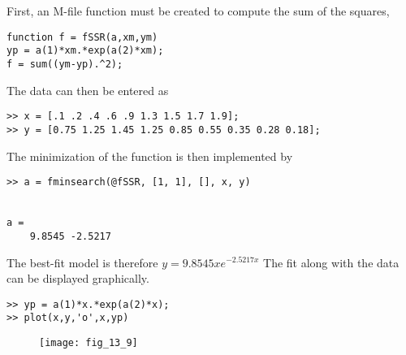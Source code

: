 \documentclass[../main.tex]{subfiles}
\begin{document}
\section{}
First, an M-file function must be created to compute the sum of the squares,
	\bigbreak
\begin{lstlisting}[numbers=none]
function f = fSSR(a,xm,ym)
yp = a(1)*xm.*exp(a(2)*xm);
f = sum((ym-yp).^2); 
\end{lstlisting}
	\bigbreak
The data can then be entered as
\begin{lstlisting}[numbers=none]
>> x = [.1 .2 .4 .6 .9 1.3 1.5 1.7 1.9];
>> y = [0.75 1.25 1.45 1.25 0.85 0.55 0.35 0.28 0.18]; 
\end{lstlisting}
	\bigbreak
The minimization of the function is then implemented by
	\bigbreak
\begin{lstlisting}[numbers=none]
>> a = fminsearch(@fSSR, [1, 1], [], x, y)


a =
	9.8545 -2.5217 
\end{lstlisting}
	\bigbreak
The best-fit model is therefore
	\bigbreak
$y=9.8545 x e^{-2.5217 x}$
	\bigbreak
The fit along with the data can be displayed graphically.
	\bigbreak
\begin{lstlisting}[numbers=none]
>> yp = a(1)*x.*exp(a(2)*x);
>> plot(x,y,'o',x,yp) 
\end{lstlisting}
	\bigbreak
	\begin{figure}[H]
		\texttt{[image: fig\_13\_9]}
		\label{fig:fig_13_9}
	\end{figure}
	\bigbreak
\end{document}
